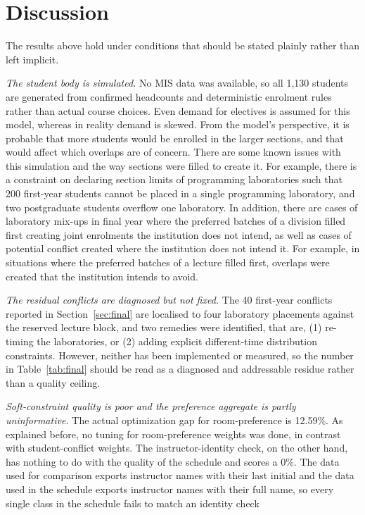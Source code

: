 \documentclass[journal]{IEEEtran}
\begin{document}
\section{Discussion}
\label{sec:discussion}

The results above hold under conditions that should be stated plainly rather than left implicit.

\emph{The student body is simulated.} No MIS data was available, so all 1,130 students are generated from confirmed headcounts and deterministic enrolment rules rather than actual course choices. Even demand for electives is assumed for this model, whereas in reality demand is skewed. From the model’s perspective, it is probable that more students would be enrolled in the larger sections, and that would affect which overlaps are of concern. There are some known issues with this simulation and the way sections were filled to create it. For example, there is a constraint on declaring section limits of programming laboratories such that 200 first-year students cannot be placed in a single programming laboratory, and two postgraduate students overflow one laboratory. In addition, there are cases of laboratory mix-ups in final year where the preferred batches of a division filled first creating joint enrolments the institution does not intend, as well as cases of potential conflict created where the institution does not intend it. For example, in situations where the preferred batches of a lecture filled first, overlaps were created that the institution intends to avoid.

\emph{The residual conflicts are diagnosed but not fixed.} The 40 first-year conflicts reported in Section~\ref{sec:final} are localised to four laboratory placements against the reserved lecture block, and two remedies were identified, that are, (1) re-timing the laboratories, or (2) adding explicit different-time distribution constraints. However, neither has been implemented or measured, so the number in Table~\ref{tab:final} should be read as a diagnosed and addressable residue rather than a quality ceiling.

\emph{Soft-constraint quality is poor and the preference aggregate is partly uninformative.} The actual optimization gap for room-preference is 12.59\%. As explained before, no tuning for room-preference weights was done, in contrast with student-conflict weights. The instructor-identity check, on the other hand, has nothing to do with the quality of the schedule and scores a 0\%. The data used for comparison exports instructor names with their last initial and the data used in the schedule exports instructor names with their full name, so every single class in the schedule fails to match an identity check
\end{document}
